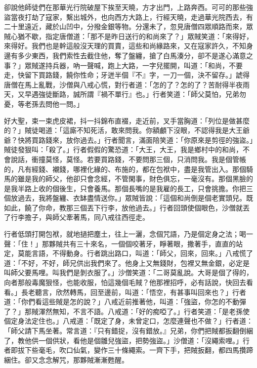 卻說他師徒們在那華光行院破屋下挨至天曉，方才出門，上路奔西。可可的那些強盜當夜打劫了寇家，繫出城外，也向西方大路上，行經天曉，走過華光院西去，有二十里遠近，藏於山凹中，分撥金銀等物。分還未了，忽見唐僧四眾順路而來，眾賊心猶不歇，指定唐僧道：「那不是昨日送行的和尚來了？」眾賊笑道：「來得好，來得好。我們也是幹這般沒天理的買賣，這些和尚緣路來，又在寇家許久，不知身邊有多少東西，我們索性去截住他，奪了盤纏，搶了白馬湊分，卻不是遂心滿意之事？」眾賊遂持兵器，吶一聲喊，跑上大路，一字兒擺開，叫道：「和尚，不要走，快留下買路錢，饒你性命；牙迸半個『不』字，一刀一個，決不留存。」諕得唐僧在馬上亂戰，沙僧與八戒心慌，對行者道：「怎的了？怎的了？苦耐得半夜雨天，又早遇強徒斷路，誠所謂『禍不單行』也。」行者笑道：「師父莫怕，兄弟勿憂，等老孫去問他一問。」

好大聖，束一束虎皮裙，抖一抖錦布直裰，走近前，叉手當胸道：「列位是做甚麼的？」賊徒喝道：「這廝不知死活，敢來問我。你額顱下沒眼，不認得我是大王爺爺？快將買路錢來，放你過去。」行者聞言，滿面陪笑道：「你原來是剪徑的強盜。」賊徒發狠叫：「殺了。」行者假假的驚恐道：「大王，大王，我是鄉村中的和尚，不會說話，衝撞莫怪，莫怪。若要買路錢，不要問那三個，只消問我。我是個管帳的，凡有經錢、襯錢，哪裡化緣的、布施的，都在包袱中，盡是我管出入。那個騎馬的雖是我的師父，他卻只會念經，不管閑事，財色俱忘，一毫沒有。那個黑臉的是我半路上收的個後生，只會養馬。那個長嘴的是我雇的長工，只會挑擔。你把三個放過去，我將盤纏、衣缽盡情送你。」眾賊皆說：「這個和尚倒是個老實頭兒。既如此，饒了你命，教那三個丟下行李，放他過去。」行者回頭使個眼色，沙僧就丟了行李擔子，與師父牽著馬，同八戒往西徑走。

行者低頭打開包袱，就地撾把塵土，往上一灑，念個咒語，乃是個定身之法；喝一聲：「住！」那夥賊共有三十來名，一個個咬著牙，睜著眼，撒著手，直直的站定，莫能言語，不得動身。行者跳出路口，叫道：「師父，回來，回來。」八戒慌了道：「不好，不好，師兄供出我們來了。他身上又無錢財，包裡又無金銀，必定是叫師父要馬哩。叫我們是剝衣服了。」沙僧笑道：「二哥莫亂說。大哥是個了得的，向者那般毒魔狠怪，也能收服，怕這幾個毛賊？他那裡招呼，必有話說，快回去看看。」長老聽言，欣然轉馬，回至邊前，叫道：「悟空，有甚事叫回來也？」行者道：「你們看這些賊是怎的說？」八戒近前推著他，叫道：「強盜，你怎的不動彈了？」那賊渾然無知，不言不語。八戒道：「好的痴啞了。」行者笑道：「是老孫使個定身法定住也。」八戒道：「既定了身，未曾定口，怎麼連聲也不做？」行者道：「師父請下馬坐著。常言道：『只有錯捉，沒有錯放。』兄弟，你們把賊都扳翻倒綑了，教他供一個供狀，看他是個雛兒強盜，把勢強盜。」沙僧道：「沒繩索哩。」行者即拔下些毫毛，吹口仙氣，變作三十條繩索。一齊下手，把賊扳翻，都四馬攢蹄綑住。卻又念念解咒，那夥賊漸漸甦醒。


